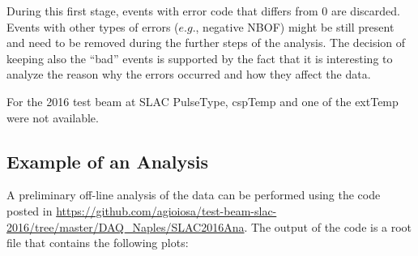 During this first stage, events with error code that differs from 0 are discarded. Events with other types of errors ($e.g.$, negative NBOF) might be still present and need to be removed during the further steps of the analysis. The decision of keeping also the ``bad'' events is supported by the fact that it is interesting to analyze the reason why the errors occurred and how they affect the data.

For the 2016 test beam at SLAC PulseType, cspTemp and one of the extTemp were not available.


\subsection{Example of an Analysis}

A preliminary off-line analysis of the data can be performed using the code posted in \url{https://github.com/agioiosa/test-beam-slac-2016/tree/master/DAQ_Naples/SLAC2016Ana}. The output of the code is a root file that contains the following plots:

